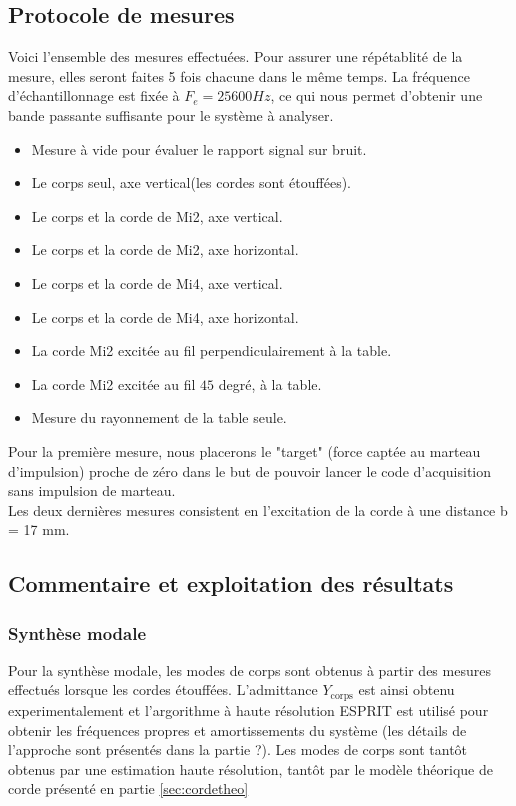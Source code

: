 \subsection{Protocole de mesures}

Voici l'ensemble des mesures effectuées. Pour assurer une répétablité de la
mesure, elles seront faites 5 fois chacune dans le même temps. La  fréquence
d'échantillonnage est fixée à $F_e = 25600Hz$, ce qui nous permet d'obtenir
une bande passante suffisante pour le système à analyser.

\begin{itemize}
\item Mesure à vide pour évaluer le rapport signal sur bruit.
\item Le corps seul, axe vertical(les cordes sont étouffées).
\item Le corps et la corde de Mi2, axe vertical.
\item Le corps et la corde de Mi2, axe horizontal.
\item Le corps et la corde de Mi4, axe vertical.
\item Le corps et la corde de Mi4, axe horizontal. 
\item La corde Mi2 excitée au fil perpendiculairement à la table.
\item La corde Mi2 excitée au fil $45$ degré, à la table.
\item Mesure du rayonnement de la table seule.
\end{itemize}

Pour la première mesure, nous placerons le "target" (force captée au marteau
d'impulsion) proche de zéro dans le but de pouvoir lancer le code d'acquisition
sans impulsion de marteau. \\ Les deux dernières mesures consistent en
l'excitation de la corde à une distance b = 17 mm. 

\subsection{Commentaire et exploitation des résultats}
\subsubsection{Synthèse modale}

Pour la synthèse modale, les modes de corps sont obtenus à partir des mesures
effectués lorsque les cordes étouffées.  L'admittance $Y_{\text{corps}}$ est
ainsi obtenu experimentalement et l'argorithme à haute résolution ESPRIT est
utilisé pour obtenir les fréquences propres et amortissements du système (les
détails de l'approche sont présentés dans la partie ?).  Les modes de corps
sont tantôt obtenus par une estimation haute résolution, tantôt par le modèle
théorique de corde présenté en partie \ref{sec:cordetheo}

